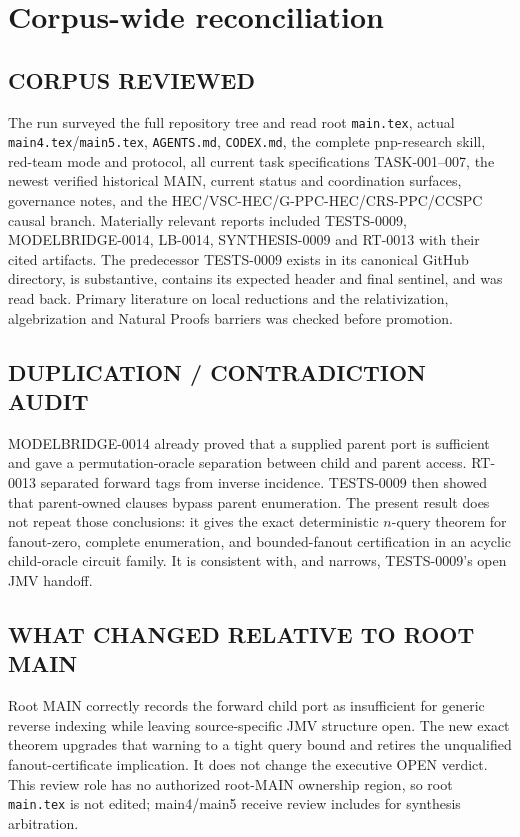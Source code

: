 \documentclass[11pt]{article}
\begin{document}
\section{Corpus-wide reconciliation}

\subsection*{CORPUS REVIEWED}
The run surveyed the full repository tree and read root \texttt{main.tex},
actual \texttt{main4.tex}/\texttt{main5.tex}, \texttt{AGENTS.md},
\texttt{CODEX.md}, the complete pnp-research skill, red-team mode and
protocol, all current task specifications TASK-001--007, the newest verified
historical MAIN, current status and coordination surfaces, governance notes,
and the HEC/VSC-HEC/G-PPC-HEC/CRS-PPC/CCSPC causal branch.  Materially
relevant reports included TESTS-0009, MODELBRIDGE-0014, LB-0014,
SYNTHESIS-0009 and RT-0013 with their cited artifacts.  The predecessor
TESTS-0009 exists in its canonical GitHub directory, is substantive,
contains its expected header and final sentinel, and was read back.
Primary literature on local reductions and the relativization,
algebrization and Natural Proofs barriers was checked before promotion.

\subsection*{DUPLICATION / CONTRADICTION AUDIT}
MODELBRIDGE-0014 already proved that a supplied parent port is sufficient and
gave a permutation-oracle separation between child and parent access.
RT-0013 separated forward tags from inverse incidence.  TESTS-0009 then
showed that parent-owned clauses bypass parent enumeration.  The present
result does not repeat those conclusions: it gives the exact deterministic
$n$-query theorem for fanout-zero, complete enumeration, and bounded-fanout
certification in an acyclic child-oracle circuit family.  It is consistent
with, and narrows, TESTS-0009's open JMV handoff.

\subsection*{WHAT CHANGED RELATIVE TO ROOT MAIN}
Root MAIN correctly records the forward child port as insufficient for
generic reverse indexing while leaving source-specific JMV structure open.
The new exact theorem upgrades that warning to a tight query bound and
retires the unqualified fanout-certificate implication.  It does not change
the executive OPEN verdict.  This review role has no authorized root-MAIN
ownership region, so root \texttt{main.tex} is not edited; main4/main5
receive review includes for synthesis arbitration.
\end{document}
